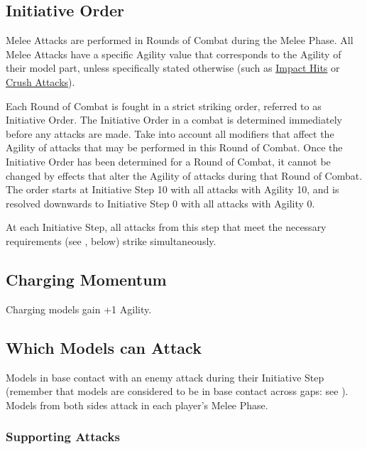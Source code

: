 \subsection{Initiative Order}
\label{initiative_order}

Melee Attacks are performed in Rounds of Combat during the Melee Phase. All Melee Attacks have a specific Agility value that corresponds to the Agility of their model part, unless specifically stated otherwise (such as \hyperref[impact_hits]{Impact Hits} or \hyperref[crush_attack]{Crush Attacks}).
\par
Each Round of Combat is fought in a strict striking order, referred to as Initiative Order. The Initiative Order in a combat is determined immediately before any attacks are made. Take into account all modifiers that affect the Agility of attacks that may be performed in this Round of Combat. Once the Initiative Order has been determined for a Round of Combat, it cannot be changed by effects that alter the Agility of attacks during that Round of Combat. The order starts at Initiative Step 10 with all attacks with Agility 10, and is resolved downwards to Initiative Step 0 with all attacks with Agility 0.
\par
At each Initiative Step, all attacks from this step that meet the necessary requirements (see , below) strike simultaneously.

\subsection{Charging Momentum}
\label{charging_momentum}

Charging models gain +1 Agility.

\subsection{Which Models can Attack}
\label{which_models_can_attack}

Models in base contact with an enemy attack during their Initiative Step (remember that models are considered to be in base contact across gaps: see ). Models from both sides attack in each player's Melee Phase.

\newpage
\subsubsection{Supporting Attacks}
\label{supporting_attacks}


